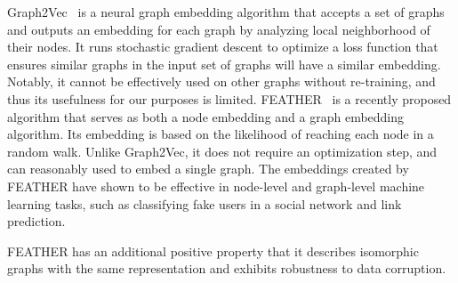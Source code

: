 \documentclass{ecai}
\newcommand{\Carmel}[1]{\textcolor{red}{\textsc{Carmel}: #1}}
\newcommand{\Omri}[1]{}
\newcommand{\Roni}[1]{}
\newcommand{\shortcite}[1]{\cite{#1}}
\newcommand{\fgtv}[1]{\ensuremath{\textit{FG2V}}\xspace}
\begin{document}
Graph2Vec~\cite{narayanan2017graph2vec} is a neural graph embedding algorithm that accepts a set of graphs and outputs an embedding for each graph by analyzing local neighborhood of their nodes. It runs stochastic gradient descent to optimize a loss function that ensures similar graphs in the input set of graphs will have a similar embedding. Notably, it cannot be effectively used on other graphs without re-training, and thus its usefulness for our purposes is limited. 
FEATHER~\cite{rozemberczki2020characteristic} is a recently proposed algorithm that serves as both a node embedding and a graph embedding algorithm. 
Its embedding is based on the likelihood of reaching each node in a random walk. 
Unlike Graph2Vec, it does not require an optimization step, and can reasonably used to embed a single graph.  
The embeddings created by FEATHER have shown to be effective in node-level and graph-level machine learning tasks, such as classifying fake users in a social network and link prediction.
\Roni{We already cited the FEATHER paper, which does this. If there's a follow up paper with applications of FEATHER- yes! please add it} 
FEATHER has an additional positive property that it describes isomorphic graphs with the same representation and exhibits robustness to data corruption. 
\Omri{Last sentence is not clear (to me) - what do we mean by data corruption and why invariant to isomorphism is interesting for our use case?}
\Roni{ Ideally, at least for \fgtv\ , isomorphic graph corresponds to the same MAPF problem and so same AS algorithm should be selected. So, this invariant is good for us. Not sure worth elaborating on this.}

\end{document}
